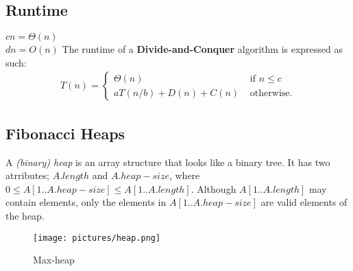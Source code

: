 \subsection*{Runtime}
$cn=\Theta(n)$\\
$dn=O(n)$
\newline\newline
The runtime of a \textbf{Divide-and-Conquer} algorithm is expressed as such:
\begin{align*}
  T(n)=
  \begin{cases}
    \Theta(n)&\textrm{ if }n\leq c\\
    aT(n/b)+D(n)+C(n)&\textrm{ otherwise.}
  \end{cases}
\end{align*}
\subsection*{Fibonacci Heaps}
A \textit{(binary) heap} is an array structure that looks like a binary tree.
It has two atrributes; $A.length$ and $A.heap-size$, where $0\leq
A[1..A.heap-size]\leq A[1..A.length]$.\newline
Although $A[1..A.length]$ may contain elements, only the elements in
$A[1..A.heap-size]$ are valid elements of the heap.
\begin{figure}[H]
  \texttt{[image: pictures/heap.png]}
  \caption{Max-heap}
\end{figure}
